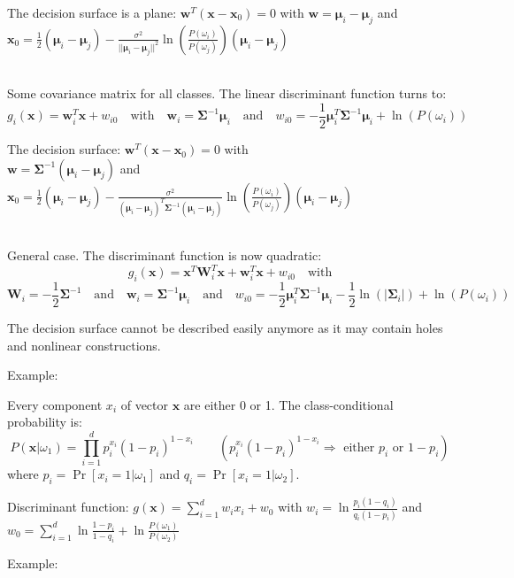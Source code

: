   The decision surface is a plane: $\mathbf{w}^T(\mathbf{x}-\mathbf{x}_0) = 0$ with $\mathbf{w} = \boldsymbol{\mu}_i - \boldsymbol{\mu}_j$ and 
  $\mathbf{x}_0 = \frac{1}{2}(\boldsymbol{\mu}_i-\boldsymbol{\mu}_j) - \frac{\sigma^2}{||\boldsymbol{\mu}_i-\boldsymbol{\mu}_j||^2} \ln\left(\frac{P(\omega_i)}{P(\omega_j)}\right) (\boldsymbol{\mu}_i-\boldsymbol{\mu}_j)$
  
  
  \\
  Some covariance matrix for all classes.
  The linear discriminant function turns to: 
  $$g_i(\mathbf{x}) = \mathbf{w}_i^T \mathbf{x} + w_{i0} \quad \text{with} \quad
  \mathbf{w}_i = \boldsymbol{\Sigma}^{-1}\boldsymbol{\mu}_i \quad \text{and} \quad
  w_{i0} = -\frac{1}{2} \boldsymbol{\mu}_i^T \boldsymbol{\Sigma}^{-1}\boldsymbol{\mu}_i + \ln(P(\omega_i))$$
  
  The decision surface: $\mathbf{w}^T(\mathbf{x}-\mathbf{x}_0) = 0$ \quad with \\
  $\mathbf{w} = \boldsymbol{\Sigma}^{-1} (\boldsymbol{\mu}_i - \boldsymbol{\mu}_j)$ \quad and \quad 
  $\mathbf{x}_0 = \frac{1}{2}(\boldsymbol{\mu}_i-\boldsymbol{\mu}_j) - \frac{\sigma^2}{(\boldsymbol{\mu}_i-\boldsymbol{\mu}_j)^T \boldsymbol{\Sigma}^{-1} (\boldsymbol{\mu}_i-\boldsymbol{\mu}_j)} \ln\left(\frac{P(\omega_i)}{P(\omega_j)}\right) (\boldsymbol{\mu}_i-\boldsymbol{\mu}_j)$
  
  
  \\
  General case.
  The discriminant function is now quadratic: 
  $$g_i(\mathbf{x}) = \mathbf{x}^T \mathbf{W}_i^T \mathbf{x} + \mathbf{w}_i^T \mathbf{x} +w_{i0} \quad\text{with}$$
  $$\mathbf{W}_i = -\frac{1}{2} \boldsymbol{\Sigma}^{-1} \quad\text{and}\quad
  \mathbf{w}_i = \boldsymbol{\Sigma}^{-1}\boldsymbol{\mu}_i \quad\text{and}\quad
  w_{i0} = -\frac{1}{2} \boldsymbol{\mu}_i^T\boldsymbol{\Sigma}^{-1}\boldsymbol{\mu}_i - \frac{1}{2}\ln(|\boldsymbol{\Sigma}_i|) + \ln(P(\omega_i))$$
  
  The decision surface cannot be described easily anymore as it may contain holes and nonlinear constructions.
  
  Example: 
  

  Every component $x_i$ of vector $\mathbf{x}$ are either 0 or 1. The class-conditional probability is:\\
  $$P(\mathbf{x}|\omega_1)=\prod\limits_{i=1}^d p_i^{x_i}(1-p_i)^{1-x_i} \qquad ( p_i^{x_i}(1-p_i)^{1-x_i} \Rightarrow\text{ either }p_i\text{ or }1-p_i)$$
  where $p_i = \operatorname{Pr}\left[x_i=1|\omega_1\right]$ and $q_i = \operatorname{Pr}\left[ x_i=1 | \omega_2 \right]$.
  
  
  Discriminant function: $g(\bm x) = \sum\limits_{i=1}^d w_i x_i + w_0$ with 
  $w_i = \ln \frac{p_i(1-q_i)}{q_i(1-p_i)}$ and 
  $w_0 = \sum\limits_{i=1}^d \ln \frac{1-p_i}{1-q_i} + \ln \frac{P(\omega_1)}{P(\omega_2)}$
  
  Example: 